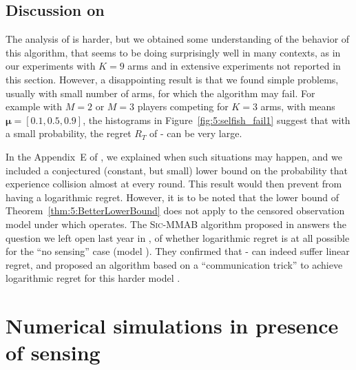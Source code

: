 \subsection{Discussion on \Selfish} \label{sub:5:SelfishFails}

The analysis of \Selfish{} is harder, but we obtained some understanding of the behavior of this algorithm, that seems to be doing surprisingly well in many contexts, as in our experiments with $K=9$ arms and in extensive experiments not reported in this section. However, a disappointing result is that we found simple problems, usually with small number of arms, for which the algorithm may fail. For example with $M=2$ or $M=3$ players competing for $K=3$ arms,
with means $\boldsymbol{\mu} = [0.1, 0.5, 0.9]$, the histograms in Figure~\ref{fig:5:selfish_fail1} suggest that with a small probability, the regret $R_T$ of \Selfish-\klUCB{} can be very large.

In the Appendix~E of \cite{Besson2018ALT},
we explained when such situations may happen, and we included a conjectured (constant, but small) lower bound on the probability that \Selfish{} experience collision almost at every round. This result would then prevent \Selfish{} from having a logarithmic regret. However, it is to be noted that the lower bound of Theorem~\ref{thm:5:BetterLowerBound} does not apply to the censored observation model \modeltrois{} under which \Selfish{} operates.
%
The \textsc{Sic-MMAB} algorithm proposed in \cite{BoursierPerchet18} answers the question we left open last year in \cite{Besson2018ALT},
of whether logarithmic regret is at all possible for the ``no sensing'' case (model \modeltrois).
They confirmed that \Selfish-\UCB{} can indeed suffer linear regret, and proposed an algorithm based on a ``communication trick'' to achieve logarithmic regret for this harder model \modeltrois.



\section{Numerical simulations in presence of sensing}
\label{sec:5:experiments}



